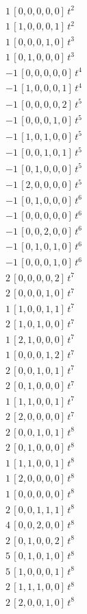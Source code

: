 \begin{align*}
1\,[0,0,0,0,0]\,t^{2} \\
1\,[1,0,0,0,1]\,t^{2} \\
1\,[0,0,0,1,0]\,t^{3} \\
1\,[0,1,0,0,0]\,t^{3} \\
-1\,[0,0,0,0,0]\,t^{4} \\
-1\,[1,0,0,0,1]\,t^{4} \\
-1\,[0,0,0,0,2]\,t^{5} \\
-1\,[0,0,0,1,0]\,t^{5} \\
-1\,[1,0,1,0,0]\,t^{5} \\
-1\,[0,0,1,0,1]\,t^{5} \\
-1\,[0,1,0,0,0]\,t^{5} \\
-1\,[2,0,0,0,0]\,t^{5} \\
-1\,[0,1,0,0,0]\,t^{6} \\
-1\,[0,0,0,0,0]\,t^{6} \\
-1\,[0,0,2,0,0]\,t^{6} \\
-1\,[0,1,0,1,0]\,t^{6} \\
-1\,[0,0,0,1,0]\,t^{6} \\
2\,[0,0,0,0,2]\,t^{7} \\
2\,[0,0,0,1,0]\,t^{7} \\
1\,[1,0,0,1,1]\,t^{7} \\
2\,[1,0,1,0,0]\,t^{7} \\
1\,[2,1,0,0,0]\,t^{7} \\
1\,[0,0,0,1,2]\,t^{7} \\
2\,[0,0,1,0,1]\,t^{7} \\
2\,[0,1,0,0,0]\,t^{7} \\
1\,[1,1,0,0,1]\,t^{7} \\
2\,[2,0,0,0,0]\,t^{7} \\
2\,[0,0,1,0,1]\,t^{8} \\
2\,[0,1,0,0,0]\,t^{8} \\
1\,[1,1,0,0,1]\,t^{8} \\
1\,[2,0,0,0,0]\,t^{8} \\
1\,[0,0,0,0,0]\,t^{8} \\
2\,[0,0,1,1,1]\,t^{8} \\
4\,[0,0,2,0,0]\,t^{8} \\
2\,[0,1,0,0,2]\,t^{8} \\
5\,[0,1,0,1,0]\,t^{8} \\
5\,[1,0,0,0,1]\,t^{8} \\
2\,[1,1,1,0,0]\,t^{8} \\
2\,[2,0,0,1,0]\,t^{8} \\

\end{align*}
